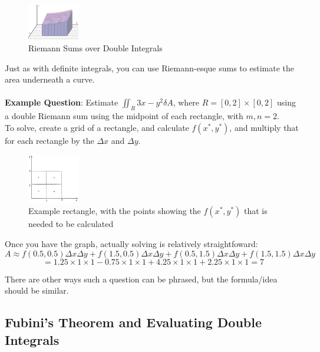 \documentclass{article}
\begin{document}
\begin{figure}[H]
    \centering
    \includegraphics[width=0.2\textwidth]{figures/RiemannSumsDoubleIntegralsExample.png}
    \caption{Riemann Sums over Double Integrals}
\end{figure}

Just as with definite integrals, you can use Riemann-esque sums to estimate the area underneath a curve. \\  ~ \\
\textbf{Example Question}: Estimate $\iint_{R} 3x-y^2 \delta A$, where $R = [0,2] \times [0,2]$ using a double Riemann sum using the midpoint  of each rectangle, with $m, n = 2$.\\
To solve, create a grid of a rectangle, and calculate $f(x^*, y^*)$, and multiply that for each rectangle by the $\Delta x$ and $\Delta y$.

\begin{figure}[H]
    \centering
    \includegraphics[width=0.2\textwidth]{figures/ExampleRectangle.png}
    \caption{Example rectangle, with the points showing the $f(x^*, y^*)$ that is needed to be calculated}
\end{figure}

Once you have the graph, actually solving is relatively straightfoward: $$A \approx f(0.5, 0.5)  \Delta x  \Delta y + f(1.5, 0.5)  \Delta x  \Delta y + f(0.5, 1.5)  \Delta x  \Delta y + f(1.5, 1.5)  \Delta x  \Delta y $$
$$= 1.25 \times 1 \times 1 -0.75 \times 1 \times 1 + 4.25 \times 1 \times 1 + 2.25 \times 1 \times 1 = \boxed{7}$$

There are other ways such a question can be phrased, but the formula/idea should be similar.


\subsection{Fubini's Theorem and Evaluating Double Integrals}
\end{document}
